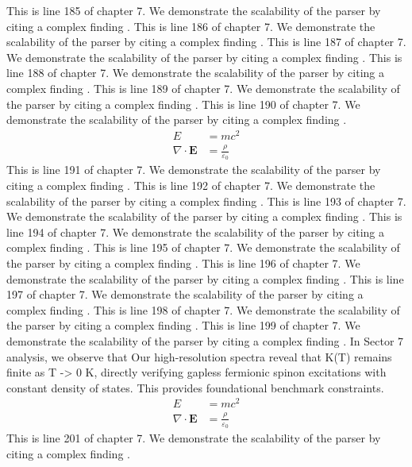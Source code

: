 This is line 185 of chapter 7. We demonstrate the scalability of the parser by citing a complex finding \cite{ref7_185}.
This is line 186 of chapter 7. We demonstrate the scalability of the parser by citing a complex finding \cite{ref7_186}.
This is line 187 of chapter 7. We demonstrate the scalability of the parser by citing a complex finding \cite{ref7_187}.
This is line 188 of chapter 7. We demonstrate the scalability of the parser by citing a complex finding \cite{ref7_188}.
This is line 189 of chapter 7. We demonstrate the scalability of the parser by citing a complex finding \cite{ref7_189}.
This is line 190 of chapter 7. We demonstrate the scalability of the parser by citing a complex finding \cite{ref7_190}.
\begin{align*}
  E &= mc^2 \\
  \nabla \cdot \mathbf{E} &= \frac{\rho}{\varepsilon_0}
\end{align*}
This is line 191 of chapter 7. We demonstrate the scalability of the parser by citing a complex finding \cite{ref7_191}.
This is line 192 of chapter 7. We demonstrate the scalability of the parser by citing a complex finding \cite{ref7_192}.
This is line 193 of chapter 7. We demonstrate the scalability of the parser by citing a complex finding \cite{ref7_193}.
This is line 194 of chapter 7. We demonstrate the scalability of the parser by citing a complex finding \cite{ref7_194}.
This is line 195 of chapter 7. We demonstrate the scalability of the parser by citing a complex finding \cite{ref7_195}.
This is line 196 of chapter 7. We demonstrate the scalability of the parser by citing a complex finding \cite{ref7_196}.
This is line 197 of chapter 7. We demonstrate the scalability of the parser by citing a complex finding \cite{ref7_197}.
This is line 198 of chapter 7. We demonstrate the scalability of the parser by citing a complex finding \cite{ref7_198}.
This is line 199 of chapter 7. We demonstrate the scalability of the parser by citing a complex finding \cite{ref7_199}.
In Sector 7 analysis, we observe that Our high-resolution spectra reveal that K(T) remains finite as T -> 0 K, directly verifying gapless fermionic spinon excitations with constant density of states. This provides foundational benchmark constraints.
\begin{align*}
  E &= mc^2 \\
  \nabla \cdot \mathbf{E} &= \frac{\rho}{\varepsilon_0}
\end{align*}
This is line 201 of chapter 7. We demonstrate the scalability of the parser by citing a complex finding \cite{ref7_201}.
